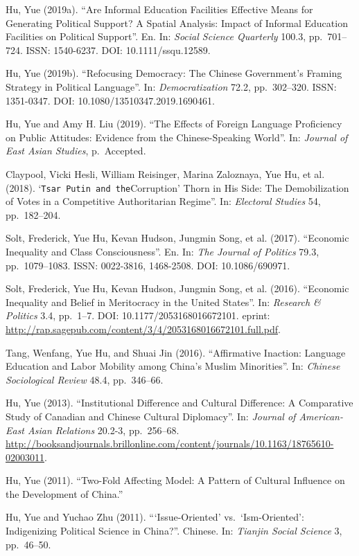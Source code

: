 \documentclass[10.5pt,]{article}
\begin{document}
Hu, Yue (2019a). ``Are Informal Education Facilities Effective Means for
Generating Political Support? A Spatial Analysis: Impact of Informal
Education Facilities on Political Support''. En. In:
\emph{Social Science Quarterly} 100.3, pp.~701--724. ISSN: 1540-6237.
DOI: 10.1111/ssqu.12589.

Hu, Yue (2019b). ``Refocusing Democracy: The Chinese Government's
Framing Strategy in Political Language''. In: \emph{Democratization}
72.2, pp.~302--320. ISSN: 1351-0347. DOI: 10.1080/13510347.2019.1690461.

Hu, Yue and Amy H. Liu (2019). ``The Effects of Foreign Language
Proficiency on Public Attitudes: Evidence from the Chinese-Speaking
World''. In: \emph{Journal of East Asian Studies}, p.~Accepted.

Claypool, Vicki Hesli, William Reisinger, Marina Zaloznaya, Yue Hu, et
al. (2018). `\texttt{Tsar\ Putin\ and\ the}Corruption' Thorn in His
Side: The Demobilization of Votes in a Competitive Authoritarian
Regime''. In: \emph{Electoral Studies} 54, pp.~182--204.

Solt, Frederick, Yue Hu, Kevan Hudson, Jungmin Song, et al. (2017).
``Economic Inequality and Class Consciousness''. En. In:
\emph{The Journal of Politics} 79.3, pp.~1079--1083. ISSN: 0022-3816,
1468-2508. DOI: 10.1086/690971.

Solt, Frederick, Yue Hu, Kevan Hudson, Jungmin Song, et al. (2016).
``Economic Inequality and Belief in Meritocracy in the United States''.
In: \emph{Research \& Politics} 3.4, pp.~1--7. DOI:
10.1177/2053168016672101. eprint:
\url{http://rap.sagepub.com/content/3/4/2053168016672101.full.pdf}.

Tang, Wenfang, Yue Hu, and Shuai Jin (2016). ``Affirmative Inaction:
Language Education and Labor Mobility among China's Muslim Minorities''.
In: \emph{Chinese Sociological Review} 48.4, pp.~346--66.

Hu, Yue (2013). ``Institutional Difference and Cultural Difference: A
Comparative Study of Canadian and Chinese Cultural Diplomacy''. In:
\emph{Journal of American-East Asian Relations} 20.2-3, pp.~256--68.
\url{http://booksandjournals.brillonline.com/content/journals/10.1163/18765610-02003011}.

Hu, Yue (2011). ``Two-Fold Affecting Model: A Pattern of Cultural
Influence on the Development of China.''

Hu, Yue and Yuchao Zhu (2011). ```Issue-Oriented' vs.~`Ism-Oriented':
Indigenizing Political Science in China?''. Chinese. In:
\emph{Tianjin Social Science} 3, pp.~46--50.
\end{document}
